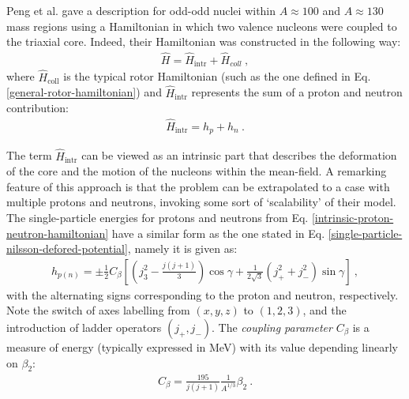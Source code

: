 Peng et al. \cite{peng2003description} gave a description for odd-odd nuclei within $A\approx 100$ and $A\approx 130$ mass regions using a Hamiltonian in which two valence nucleons were coupled to the triaxial core. Indeed, their Hamiltonian was constructed in the following way:
\begin{align}
    \hat{H}=\hat{H}_\text{intr}+\hat{H}_{coll}\ ,
\end{align}
where $\hat{H}_\text{coll}$ is the typical rotor Hamiltonian (such as the one defined in Eq. \ref{general-rotor-hamiltonian}) and $\hat{H}_\text{intr}$ represents the sum of a proton and neutron contribution:
\begin{align}
    \hat{H}_\text{intr}=h_p+h_n\ .
    \label{intrinsic-proton-neutron-hamiltonian}
\end{align}

The term $\hat{H}_\text{intr}$ can be viewed as an intrinsic part that describes the deformation of the core and the motion of the nucleons within the mean-field. A remarking feature of this approach is that the problem can be extrapolated to a case with multiple protons and neutrons, invoking some sort of `scalability' of their model. The single-particle energies for protons and neutrons from Eq. \ref{intrinsic-proton-neutron-hamiltonian} have a similar form as the one stated in Eq. \ref{single-particle-nilsson-defored-potential}, namely it is given as:
\begin{align}
    h_{p(n)}=\pm\frac{1}{2}C_\beta\left[\left(j_3^2-\frac{j(j+1)}{3}\right)\cos\gamma+\frac{1}{2\sqrt{3}}(j_+^2+j_-^2)\sin\gamma\right]\ ,
    \label{single-particle-energies-hpn}
\end{align}
with the alternating signs corresponding to the proton and neutron, respectively. Note the switch of axes labelling from $(x,y,z)$ to $(1,2,3)$, and the introduction of ladder operators $(j_+,j_-)$. The \emph{coupling parameter} $C_\beta$ is a measure of energy (typically expressed in MeV) with its value depending linearly on $\beta_2$:
\begin{align}
    C_\beta=\frac{195}{j(j+1)}\frac{1}{A^{1/3}}\beta_2\ .
\end{align}

